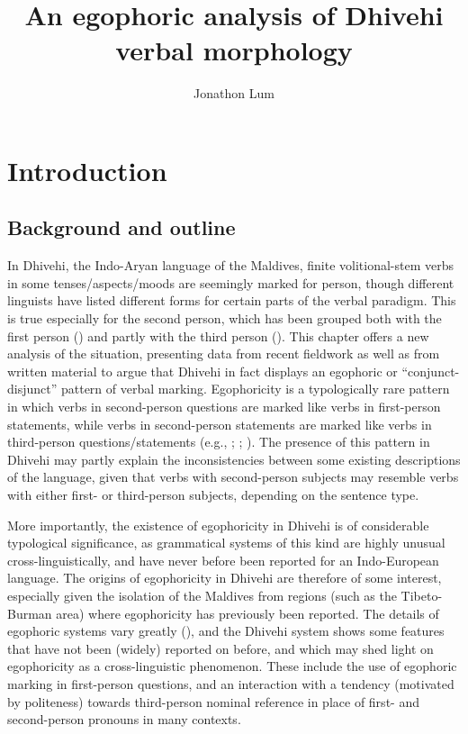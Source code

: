 \documentclass[output=paper]{langsci/langscibook}
\author{Jonathon Lum \affiliation{University of Melbourne}}
\title{An egophoric analysis of Dhivehi verbal morphology}
\begin{document}
\maketitle

\section{Introduction}\label{s:jl1}

\subsection{Background and outline}\label{s:jl1-1}

In Dhivehi, the Indo-Aryan language of the Maldives, finite volitional-stem verbs in some tenses/aspects/moods are seemingly marked for person, though different linguists have listed different forms for certain parts of the verbal paradigm. This is true especially for the second person, which has been grouped both with the first person (\citealt[23--27]{CainGair2000}) and partly with the third person (\citealt[166--169]{Fritz2002}). This chapter offers a new analysis of the situation, presenting data from recent fieldwork as well as from written material to argue that Dhivehi in fact displays an egophoric or “conjunct-disjunct” pattern of verbal marking. Egophoricity is a typologically rare pattern in which verbs in second-person questions are marked like verbs in first-person statements, while verbs in second-person statements are marked like verbs in third-person \mbox{questions/statements} (e.g., \citealt{Hale1980}; \citealt{Creissels2008}; \citealt{SanRoque2018}). The presence of this pattern in Dhivehi may partly explain the inconsistencies between some existing descriptions of the language, given that verbs with second-person subjects may resemble verbs with either first- or third-person subjects, depending on the sentence type.

More importantly, the existence of egophoricity in Dhivehi is of considerable typological significance, as grammatical systems of this kind are highly unusual cross-linguistically, and have never before been reported for an Indo-European language. The origins of egophoricity in Dhivehi are therefore of some interest, especially given the isolation of the Maldives from regions (such as the Tibeto-Burman area) where egophoricity has previously been reported. The details of egophoric systems vary greatly (\citealt{Floydetal2018}), and the Dhivehi system shows some features that have not been (widely) reported on before, and which may shed light on egophoricity as a cross-linguistic phenomenon. These include the use of egophoric marking in first-person questions, and an interaction with a tendency (motivated by politeness) towards third-person nominal reference in place of first- and second-person pronouns in many contexts.
\end{document}
